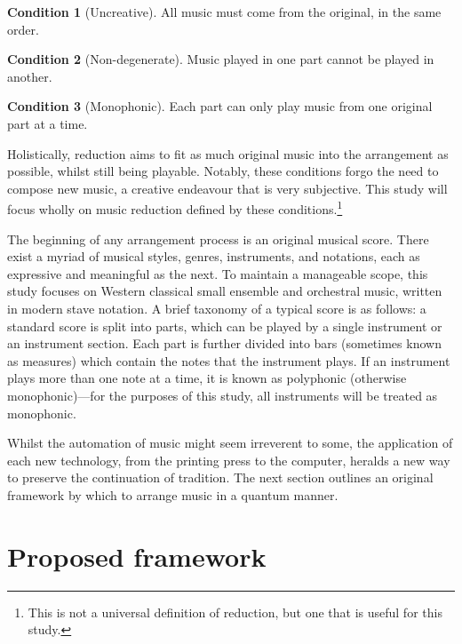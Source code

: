 \documentclass[twocolumn]{article}
\theoremstyle{definition}
\newtheorem{condition}{Condition}
\begin{document}
\begin{condition}[Uncreative]
    All music must come from the original, in the same order.
    \label{con:uncreative}
\end{condition}
\begin{condition}[Non-degenerate]
    Music played in one part cannot be played in another.
    \label{con:non-degenerate}
\end{condition}
\begin{condition}[Monophonic]
    Each part can only play music from one original part at a time.
    \label{con:monophonic}
\end{condition}

Holistically, reduction aims to fit as much original music into the arrangement as possible, whilst still being playable. Notably, these conditions forgo the need to compose new music, a creative endeavour that is very subjective. This study will focus wholly on music reduction defined by these conditions.\footnote{This is not a universal definition of reduction, but one that is useful for this study.}

The beginning of any arrangement process is an original musical score. There exist a myriad of musical styles, genres, instruments, and notations, each as expressive and meaningful as the next. To maintain a manageable scope, this study focuses on Western classical small ensemble and orchestral music, written in modern stave notation. A brief taxonomy of a typical score is as follows: a standard score is split into parts, which can be played by a single instrument or an instrument section. Each part is further divided into bars (sometimes known as measures) which contain the notes that the instrument plays. If an instrument plays more than one note at a time, it is known as polyphonic (otherwise monophonic)---for the purposes of this study, all instruments will be treated as monophonic.

Whilst the automation of music might seem irreverent to some, the application of each new technology, from the printing press to the computer, heralds a new way to preserve the continuation of tradition. The next section outlines an original framework by which to arrange music in a quantum manner.

\section*{Proposed framework}
\end{document}
